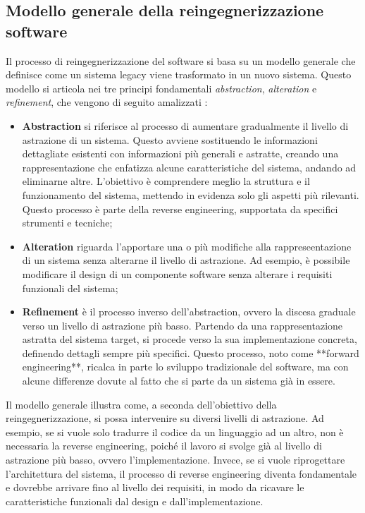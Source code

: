\subsection{Modello generale della reingegnerizzazione software}
Il processo di reingegnerizzazione del software si basa su un modello generale che definisce come un sistema legacy viene trasformato in un nuovo sistema. Questo modello si articola nei tre principi fondamentali \textit{abstraction}, \textit{alteration} e \textit{refinement}, che vengono di seguito amalizzati \cite{rosenberg1996software}:
\begin{itemize}
  \item \textbf{Abstraction} si riferisce al processo di aumentare gradualmente il livello di astrazione di un sistema. Questo avviene sostituendo le informazioni dettagliate esistenti con informazioni più generali e astratte, creando una rappresentazione che enfatizza alcune caratteristiche del sistema, andando ad eliminarne altre. L'obiettivo è comprendere meglio la struttura e il funzionamento del sistema, mettendo in evidenza solo gli aspetti più rilevanti. Questo processo è parte della reverse engineering, supportata da specifici strumenti e tecniche;
  \item \textbf{Alteration} riguarda l'apportare una o più modifiche alla rappreseentazione di un sistema senza alterarne il livello di astrazione. Ad esempio, è possibile modificare il design di un componente software senza alterare i requisiti funzionali del sistema;
  \item \textbf{Refinement} è il processo inverso dell'abstraction, ovvero la discesa graduale verso un livello di astrazione più basso. Partendo da una rappresentazione astratta del sistema target, si procede verso la sua implementazione concreta, definendo dettagli sempre più specifici. Questo processo, noto come **forward engineering**, ricalca in parte lo sviluppo tradizionale del software, ma con alcune differenze dovute al fatto che si parte da un sistema già in essere.
\end{itemize}

Il modello generale illustra come, a seconda dell'obiettivo della reingegnerizzazione, si possa intervenire su diversi livelli di astrazione. Ad esempio, se si vuole solo tradurre il codice da un linguaggio ad un altro, non è necessaria la reverse engineering, poiché il lavoro si svolge già al livello di astrazione più basso, ovvero l'implementazione. Invece, se si vuole riprogettare l'architettura del sistema, il processo di reverse engineering diventa fondamentale e dovrebbe arrivare fino al livello dei requisiti, in modo da ricavare le caratteristiche funzionali dal design e dall'implementazione.

